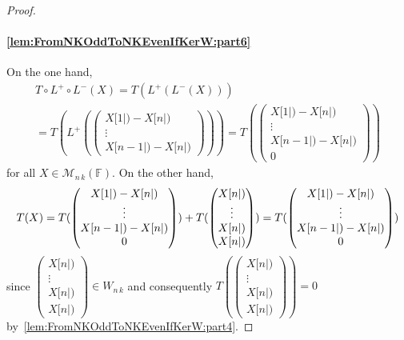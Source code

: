 \documentclass{elsarticle}
\def\F{{\mathbb F}}
\def\M{{\mathcal M}}
\theoremstyle{plain}
\theoremstyle{definition}
\numberwithin{equation}{section}
\begin{document}
\begin{proof}
\paragraph{\ref{lem:FromNKOddToNKEvenIfKerW:part6}} On the one hand,
\begin{multline*}
T \circ L^{+} \circ L^{-} (X) = T(L^{+}(L^{-}(X)))\\
 = T(L^{+}(\begin{pmatrix}X[1|) - X[n|)\\ \vdots \\X[n-1|) - X[n|)\end{pmatrix})) = T(\begin{pmatrix}X[1|) - X[n|)\\ \vdots \\X[n-1|) - X[n|)\\ 0\end{pmatrix})
\end{multline*}
for all $X \in \M_{n\,k}(\F)$. On the other hand,
\begin{equation*}
T(X) = T(\begin{pmatrix}X[1|) - X[n|)\\ \vdots \\X[n-1|) - X[n|)\\ 0\end{pmatrix}) + T(\begin{pmatrix}X[n|)\\ \vdots \\ X[n|)\\ X[n|)\end{pmatrix})\\ = T(\begin{pmatrix}X[1|) - X[n|)\\ \vdots \\X[n-1|) - X[n|)\\ 0\end{pmatrix})
\end{equation*}
since $\begin{pmatrix}X[n|)\\ \vdots \\ X[n|)\\ X[n|)\end{pmatrix} \in W_{n\,k}$ and consequently $T(\begin{pmatrix}X[n|)\\ \vdots \\ X[n|)\\ X[n|)\end{pmatrix}) = 0$ by~\ref{lem:FromNKOddToNKEvenIfKerW:part4}.


\end{proof}
\end{document}
